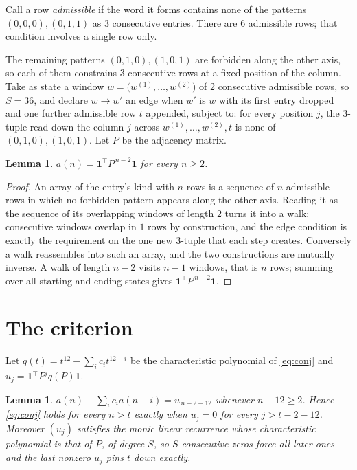 \documentclass[11pt,a4paper]{article}
\theoremstyle{plain}
\newtheorem{lemma}[theorem]{Lemma}
\theoremstyle{definition}
\begin{document}
Call a row \emph{admissible} if the word it forms contains none of the patterns
$(0,0,0), (0,1,1)$ as $3$ consecutive entries. There are $6$ admissible rows; that condition
involves a single row only.

The remaining patterns $(0,1,0), (1,0,1)$ are forbidden along the other axis, so each of them
constrains $3$ consecutive rows at a fixed position of the column. Take as state a
window $w=\bigl(w^{(1)},\dots,w^{(2)}\bigr)$ of $2$ consecutive admissible
rows, so $S=36$, and declare $w\to w'$ an edge when $w'$ is $w$ with its first entry
dropped and one further admissible row $t$ appended, subject to: for every position
$j$, the $3$-tuple read down the column $j$ across $w^{(1)},\dots,w^{(2)},t$
is none of $(0,1,0), (1,0,1)$. Let $P$ be the adjacency matrix.

\begin{lemma}\label{lem:walk}
$a(n)=\mathbf{1}^{\!\top}P^{\,n-2}\mathbf{1}$ for every $n\ge2$.
\end{lemma}

\begin{proof}
An array of the entry's kind with $n$ rows is a sequence of $n$ admissible rows in
which no forbidden pattern appears along the other axis. Reading it as the sequence of its
overlapping windows of length $2$ turns it into a walk: consecutive windows overlap in
$1$ rows by construction, and the edge condition is exactly the requirement on the one
new $3$-tuple that each step creates. Conversely a walk reassembles into such an array,
and the two constructions are mutually inverse. A walk of length $n-2$ visits $n-1$
windows, that is $n$ rows; summing over all starting and ending states gives
$\mathbf{1}^{\!\top}P^{\,n-2}\mathbf{1}$.
\end{proof}

\section{The criterion}

Let $q(t)=t^{12}-\sum_i c_i t^{12-i}$ be the characteristic polynomial of
\eqref{eq:conj} and $u_j=\mathbf{1}^{\!\top}P^{j}q(P)\mathbf{1}$.

\begin{lemma}\label{lem:crit}
$a(n)-\sum_i c_i a(n-i)=u_{\,n-2-12}$ whenever $n-12\ge2$. Hence
\eqref{eq:conj} holds for every $n>t$ exactly when $u_j=0$ for every
$j>t-2-12$. Moreover $(u_j)$ satisfies the monic linear recurrence whose
characteristic polynomial is that of $P$, of degree $S$, so $S$ consecutive zeros force all
later ones and the last nonzero $u_j$ pins $t$ down exactly.
\end{lemma}
\end{document}
